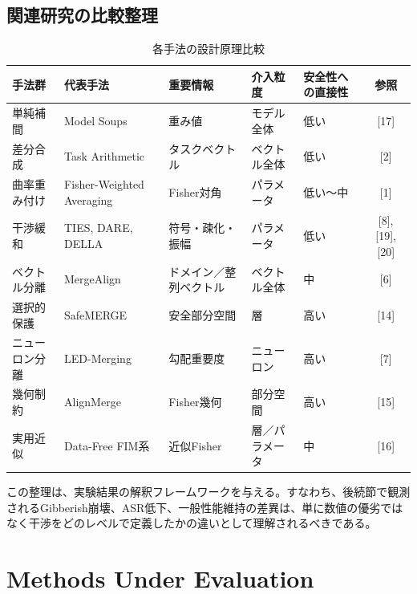 \documentclass{article}
\begin{document}
\subsection{関連研究の比較整理}
\begin{table}[H]
\centering
\caption{各手法の設計原理比較}
\label{tab:method_comparison}
\small
\begin{tabular}{p{2.0cm}p{2.4cm}p{2.5cm}p{2.0cm}p{2.2cm}c}
\toprule
手法群 & 代表手法 & 重要情報 & 介入粒度 & 安全性への直接性 & 参照 \\
\midrule
単純補間 & Model Soups & 重み値 & モデル全体 & 低い & [17] \\

差分合成 & Task Arithmetic & タスクベクトル & ベクトル全体 & 低い & [2] \\

曲率重み付け & Fisher-Weighted Averaging & Fisher対角 & パラメータ & 低い〜中 & [1] \\

干渉緩和 & TIES, DARE, DELLA & 符号・疎化・振幅 & パラメータ & 低い & [8], [19], [20] \\

ベクトル分離 & MergeAlign & ドメイン／整列ベクトル & ベクトル全体 & 中 & [6] \\

選択的保護 & SafeMERGE & 安全部分空間 & 層 & 高い & [14] \\

ニューロン分離 & LED-Merging & 勾配重要度 & ニューロン & 高い & [7] \\

幾何制約 & AlignMerge & Fisher幾何 & 部分空間 & 高い & [15] \\

実用近似 & Data-Free FIM系 & 近似Fisher & 層／パラメータ & 中 & [16] \\
\bottomrule
\end{tabular}
\end{table}

この整理は、実験結果の解釈フレームワークを与える。すなわち、後続節で観測されるGibberish崩壊、ASR低下、一般性能維持の差異は、単に数値の優劣ではなく干渉をどのレベルで定義したかの違いとして理解されるべきである。

\section{Methods Under Evaluation}
\end{document}
